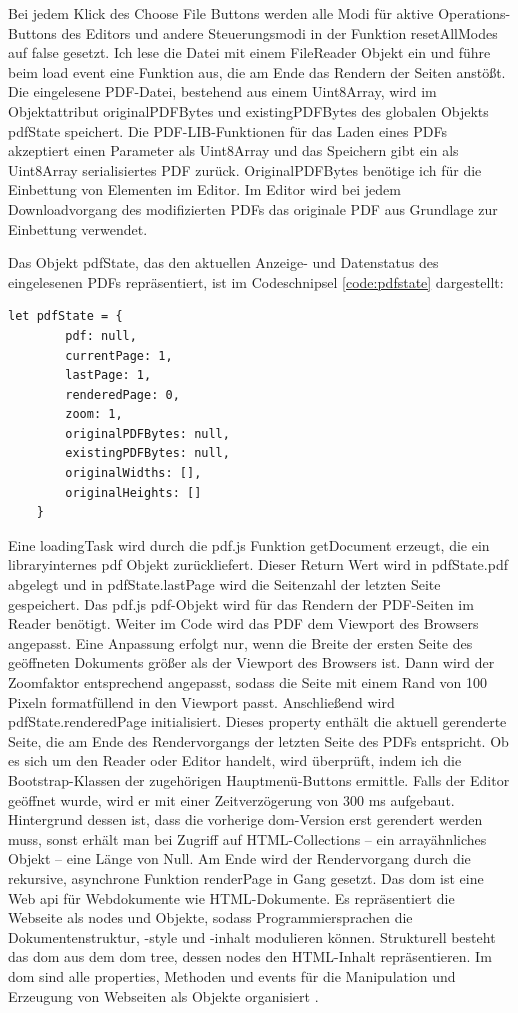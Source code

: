 Bei jedem Klick des Choose File Buttons werden alle Modi für aktive Operations-Buttons des Editors und andere Steuerungsmodi in der Funktion resetAllModes auf false gesetzt. Ich lese die Datei mit einem FileReader Objekt ein und führe beim load event eine Funktion aus, die am Ende das Rendern der Seiten anstößt. Die eingelesene PDF-Datei, bestehend aus einem Uint8Array, wird im Objektattribut originalPDFBytes und existingPDFBytes des globalen Objekts pdfState speichert. Die PDF-LIB-Funktionen für das Laden eines PDFs akzeptiert einen Parameter als Uint8Array und das Speichern gibt ein als Uint8Array serialisiertes PDF zurück. OriginalPDFBytes benötige ich für die Einbettung von Elementen im Editor. Im Editor wird bei jedem Downloadvorgang des modifizierten PDFs das originale PDF aus Grundlage zur Einbettung verwendet. 

Das Objekt pdfState, das den aktuellen Anzeige- und Datenstatus des eingelesenen PDFs repräsentiert, ist im Codeschnipsel \ref{code:pdfstate} dargestellt:

\begin{lstlisting}[style=ES6, caption={Objekt für den Status eines geöffnetes PDF-Dokuments}, label=code:pdfstate, breaklines=true]
	let pdfState = {
		pdf: null,
		currentPage: 1,
		lastPage: 1,
		renderedPage: 0,
		zoom: 1,
		originalPDFBytes: null,
		existingPDFBytes: null,
		originalWidths: [],
		originalHeights: []
	}
\end{lstlisting} 

Eine loadingTask wird durch die pdf.js Funktion getDocument erzeugt, die ein libraryinternes pdf Objekt zurückliefert. Dieser Return Wert wird in pdfState.pdf abgelegt und in pdfState.lastPage wird die Seitenzahl der letzten Seite gespeichert. Das pdf.js pdf-Objekt wird für das Rendern der PDF-Seiten im Reader benötigt. Weiter im Code wird das PDF dem Viewport des Browsers angepasst. Eine Anpassung erfolgt nur, wenn die Breite der ersten Seite des geöffneten Dokuments größer als der Viewport des Browsers ist. Dann wird der Zoomfaktor entsprechend angepasst, sodass die Seite mit einem Rand von 100 Pixeln formatfüllend in den Viewport passt. Anschließend wird pdfState.renderedPage initialisiert. Dieses property enthält die aktuell gerenderte Seite, die am Ende des Rendervorgangs der letzten Seite des PDFs entspricht. Ob es sich um den Reader oder Editor handelt, wird überprüft, indem ich die Bootstrap-Klassen der zugehörigen Hauptmenü-Buttons ermittle. Falls der Editor geöffnet wurde, wird er mit einer Zeitverzögerung von 300 ms aufgebaut. Hintergrund dessen ist, dass die vorherige \gls{dom}-Version erst gerendert werden muss, sonst erhält man bei Zugriff auf HTML-Collections – ein arrayähnliches Objekt – eine Länge von Null. Am Ende wird der Rendervorgang durch die rekursive, asynchrone Funktion renderPage in Gang gesetzt. Das \gls{dom} ist eine Web \gls{api} für Webdokumente wie HTML-Dokumente. Es repräsentiert die Webseite als nodes und Objekte, sodass Programmiersprachen die Dokumentenstruktur, -style und -inhalt modulieren können. Strukturell besteht das \gls{dom} aus dem \gls{dom} tree, dessen nodes den HTML-Inhalt repräsentieren. Im \gls{dom} sind alle properties, Methoden und events für die Manipulation und Erzeugung von Webseiten als Objekte organisiert \cite{mozilla-dom}. 

